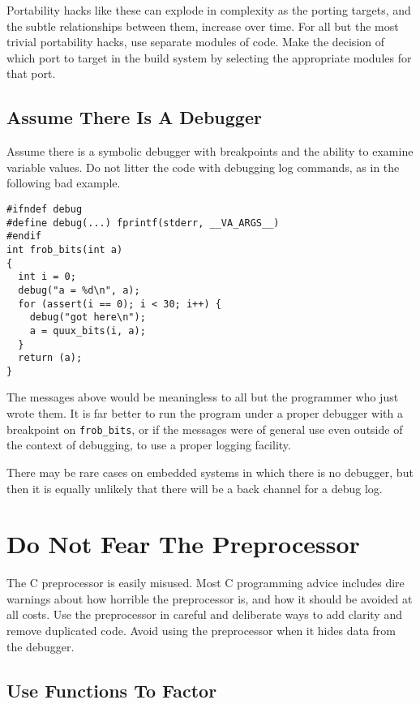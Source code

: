 \documentclass{lulu}
\newcommand{\code}[1]{\texttt{#1}\xspace}
\newcommand{\heading}[1]{\markboth{\textup{\thechapter\ -- #1}}{}}
\begin{document}
Portability hacks like these can explode in complexity as the porting
targets, and the subtle relationships between them, increase over
time.  For all but the most trivial portability hacks, use separate
modules of code.  Make the decision of which port to target in the
build system by selecting the appropriate modules for that port.

\section{Assume There Is A Debugger}

Assume there is a symbolic debugger with breakpoints and the ability
to examine variable values.  Do not litter the code with debugging log
commands, as in the following bad example.

\begin{samepage}
\begin{verbatim}
#ifndef debug
#define debug(...) fprintf(stderr, __VA_ARGS__)
#endif
int frob_bits(int a)
{
  int i = 0;
  debug("a = %d\n", a);
  for (assert(i == 0); i < 30; i++) {
    debug("got here\n");
    a = quux_bits(i, a);
  }
  return (a);
}
\end{verbatim}
\end{samepage}

The messages above would be meaningless to all but the programmer who
just wrote them.  It is far better to run the program under a proper
debugger with a breakpoint on \code{frob\_bits}, or if the messages
were of general use even outside of the context of debugging, to use a
proper logging facility.

There may be rare cases on embedded systems in which there is no
debugger, but then it is equally unlikely that there will be a back
channel for a debug log.

\chapter{Do Not Fear The Preprocessor}
\heading{Do Not Fear The Preprocessor}

The C preprocessor is easily misused.  Most C programming advice
includes dire warnings about how horrible the preprocessor is, and how
it should be avoided at all costs.  Use the preprocessor in careful
and deliberate ways to add clarity and remove duplicated code.  Avoid
using the preprocessor when it hides data from the debugger.

\section{Use Functions To Factor}
\end{document}
